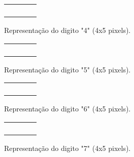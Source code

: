 \begin{figure}[h]
  \centering
  \begin{minipage}{5cm}
    \centering
    \begin{tabular}{|c|c|c|c|}
      \hline
      \B&\W&\B&\W\\ \hline
      \B&\W&\B&\W\\ \hline
      \B&\B&\B&\W\\ \hline
      \W&\W&\B&\W\\ \hline
      \W&\W&\B&\W\\ \hline
    \end{tabular}
  \end{minipage}
  \caption{Representação do digito "4" (4x5 pixels).}
  \label{fig:rep_4}  
\end{figure}
\begin{figure}[h]
  \centering
  \begin{minipage}{5cm}
    \centering
    \begin{tabular}{|c|c|c|c|}
      \hline
      \B&\B&\B&\B\\ \hline
      \B&\W&\W&\W\\ \hline
      \B&\B&\B&\W\\ \hline
      \W&\W&\W&\B\\ \hline
      \B&\B&\B&\W\\ \hline
    \end{tabular}
  \end{minipage}
  \caption{Representação do digito "5" (4x5 pixels).}
  \label{fig:rep_5}  
\end{figure}
\begin{figure}[h]
  \centering
  \begin{minipage}{5cm}
    \centering
    \begin{tabular}{|c|c|c|c|}
      \hline
      \W&\B&\B&\B\\ \hline
      \B&\W&\W&\W\\ \hline
      \B&\B&\B&\W\\ \hline
      \B&\W&\W&\B\\ \hline
      \W&\B&\B&\W\\ \hline
    \end{tabular}
  \end{minipage}
  \caption{Representação do digito "6" (4x5 pixels).}
  \label{fig:rep_6}  
\end{figure}
\begin{figure}[h]
  \centering
  \begin{minipage}{5cm}
    \centering
    \begin{tabular}{|c|c|c|c|}
      \hline
      \B&\B&\B&\B\\ \hline
      \W&\W&\W&\B\\ \hline
      \W&\W&\B&\W\\ \hline
      \W&\B&\W&\W\\ \hline
      \W&\B&\W&\W\\ \hline
    \end{tabular}
  \end{minipage}
  \caption{Representação do digito "7" (4x5 pixels).}
  \label{fig:rep_7}  
\end{figure}
